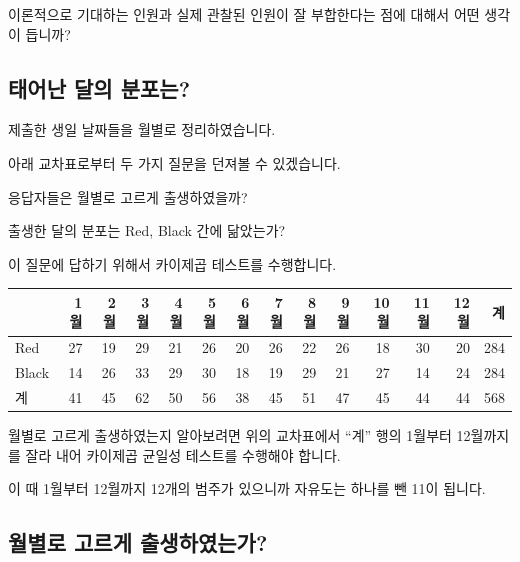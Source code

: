 \documentclass[
]{book}
\begin{document}
이론적으로 기대하는 인원과 실제 관찰된 인원이 잘 부합한다는 점에 대해서 어떤 생각이 듭니까?

\subsection{태어난 달의 분포는?}\label{uxd0dcuxc5b4uxb09c-uxb2ecuxc758-uxbd84uxd3ecuxb294-1}

제출한 생일 날짜들을 월별로 정리하였습니다.

아래 교차표로부터 두 가지 질문을 던져볼 수 있겠습니다.

응답자들은 월별로 고르게 출생하였을까?

출생한 달의 분포는 Red, Black 간에 닮았는가?

이 질문에 답하기 위해서 카이제곱 테스트를 수행합니다.

\begin{tabular}{l|r|r|r|r|r|r|r|r|r|r|r|r|r}
\hline
  & 1월 & 2월 & 3월 & 4월 & 5월 & 6월 & 7월 & 8월 & 9월 & 10월 & 11월 & 12월 & 계\\
\hline
Red & 27 & 19 & 29 & 21 & 26 & 20 & 26 & 22 & 26 & 18 & 30 & 20 & 284\\
\hline
Black & 14 & 26 & 33 & 29 & 30 & 18 & 19 & 29 & 21 & 27 & 14 & 24 & 284\\
\hline
계 & 41 & 45 & 62 & 50 & 56 & 38 & 45 & 51 & 47 & 45 & 44 & 44 & 568\\
\hline
\end{tabular}

월별로 고르게 출생하였는지 알아보려면 위의 교차표에서 ``계'' 행의 1월부터 12월까지를 잘라 내어 카이제곱 균일성 테스트를 수행해야 합니다.

이 때 1월부터 12월까지 12개의 범주가 있으니까 자유도는 하나를 뺀 11이 됩니다.

\subsection{월별로 고르게 출생하였는가?}\label{uxc6d4uxbcc4uxb85c-uxace0uxb974uxac8c-uxcd9cuxc0dduxd558uxc600uxb294uxac00-1}
\end{document}
